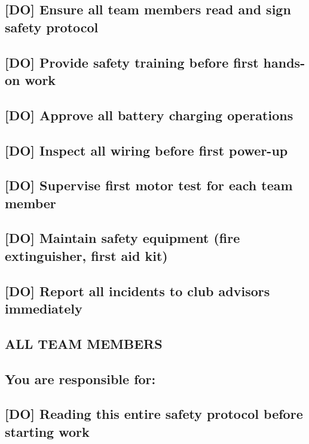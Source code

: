 \documentclass[11pt,letterpaper]{article}
\begin{document}
{{\subsection*{[DO] Ensure all team members read and sign safety protocol}

\subsection*{[DO] Provide safety training before first hands-on work}

\subsection*{[DO] Approve all battery charging operations}

\subsection*{[DO] Inspect all wiring before first power-up}

\subsection*{[DO] Supervise first motor test for each team member}

\subsection*{[DO] Maintain safety equipment (fire extinguisher, first aid kit)}

\subsection*{[DO] Report all incidents to club advisors immediately}

\subsection*{ALL TEAM MEMBERS}

\subsection*{You are responsible for:}

\subsection*{[DO] Reading this entire safety protocol before starting work}

}}
\end{document}
